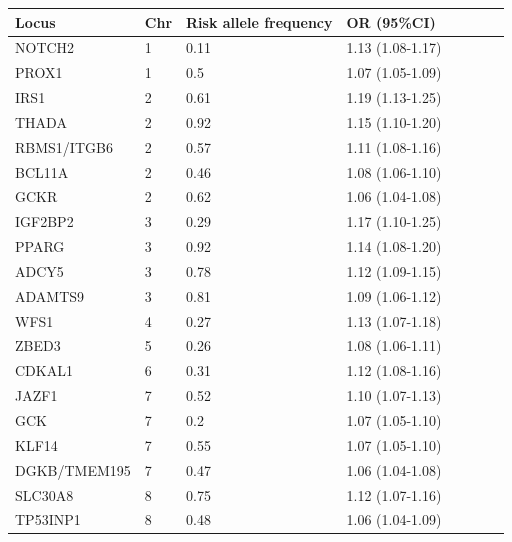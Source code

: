 \begin{table}[]
	\begin{tabular}{|l|l|l|l|>{\centering}p{.9cm}|>{\centering}p{.9cm}|>{\centering}p{.9cm}|l|}
		\hline
		Locus         & Chr & Risk allele frequency & OR (95\%CI)      \\ \hline
		NOTCH2        & 1   & 0.11                  & 1.13 (1.08-1.17) \\ \hline
		PROX1         & 1   & 0.5                   & 1.07 (1.05-1.09) \\ \hline
		IRS1          & 2   & 0.61                  & 1.19 (1.13-1.25) \\ \hline
		THADA         & 2   & 0.92                  & 1.15 (1.10-1.20) \\ \hline
		RBMS1/ITGB6   & 2   & 0.57                  & 1.11 (1.08-1.16) \\ \hline
		BCL11A        & 2   & 0.46                  & 1.08 (1.06-1.10) \\ \hline
		GCKR          & 2   & 0.62                  & 1.06 (1.04-1.08) \\ \hline
		IGF2BP2       & 3   & 0.29                  & 1.17 (1.10-1.25) \\ \hline
		PPARG         & 3   & 0.92                  & 1.14 (1.08-1.20) \\ \hline
		ADCY5         & 3   & 0.78                  & 1.12 (1.09-1.15) \\ \hline
		ADAMTS9       & 3   & 0.81                  & 1.09 (1.06-1.12) \\ \hline
		WFS1          & 4   & 0.27                  & 1.13 (1.07-1.18) \\ \hline
		ZBED3         & 5   & 0.26                  & 1.08 (1.06-1.11) \\ \hline
		CDKAL1        & 6   & 0.31                  & 1.12 (1.08-1.16) \\ \hline
		JAZF1         & 7   & 0.52                  & 1.10 (1.07-1.13) \\ \hline
		GCK           & 7   & 0.2                   & 1.07 (1.05-1.10) \\ \hline
		KLF14         & 7   & 0.55                  & 1.07 (1.05-1.10) \\ \hline
		DGKB/TMEM195  & 7   & 0.47                  & 1.06 (1.04-1.08) \\ \hline
		SLC30A8       & 8   & 0.75                  & 1.12 (1.07-1.16) \\ \hline
		TP53INP1      & 8   & 0.48                  & 1.06 (1.04-1.09) \\ \hline

\end{tabular}
\end{table}
